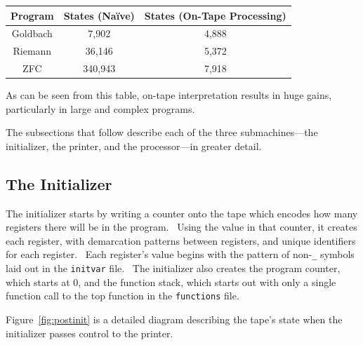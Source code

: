 \documentclass[11pt]{article}
\newcommand{\statenum}{7,918 }
\newcommand{\gbstatenum}{4,888 }
\newcommand{\rmstatenum}{5,372 }
\begin{document}
\begin{center}
    \begin{tabular}{||c c c||}
    \hline
    Program & States (Na\"ive) & States (On-Tape Processing) \\ [0.5ex]
    \hline
    Goldbach & 7,902 & \gbstatenum\\
    \hline
    Riemann & 36,146 & \rmstatenum\\
    \hline
    ZFC & 340,943 & \statenum\\
    \hline
    \end{tabular}
\end{center}

As can be seen from this table, on-tape interpretation results in huge gains, particularly in large and complex programs.

The subsections that follow describe each of the three submachines---the initializer, the printer, and the processor---in greater detail.

\subsection{The Initializer}

The initializer starts by writing a counter onto the tape which encodes how many registers there will be in the program. \ Using the value in that counter, it creates each register, with demarcation patterns between registers, and unique identifiers for each register. \ Each register's value begins with the pattern of non-\texttt{\_} symbols laid out in the \texttt{initvar} file. \ The initializer also creates the program counter, which starts at 0, and the function stack, which starts out with only a single function call to the top function in the \texttt{functions} file.

Figure~\ref{fig:postinit} is a detailed diagram describing the tape's state when the initializer passes control to the printer.
\end{document}

